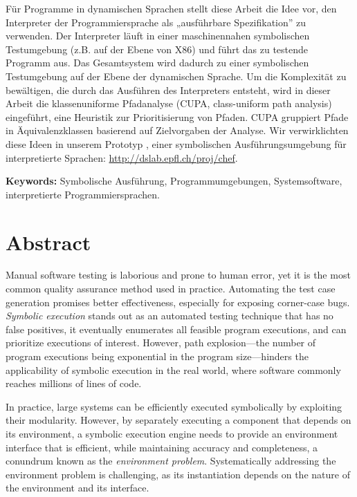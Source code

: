 Für Programme in dynamischen Sprachen stellt diese Arbeit die Idee vor, den Interpreter der Programmiersprache als „ausführbare Spezifikation” zu verwenden. Der Interpreter läuft in einer maschinennahen symbolischen Testumgebung (z.B. auf der Ebene von X86) und führt das zu testende Programm aus. Das Gesamtsystem wird dadurch zu einer symbolischen Testumgebung auf der Ebene der dynamischen Sprache. Um die Komplexität zu bewältigen, die durch das Ausführen des Interpreters entsteht, wird in dieser Arbeit die klassenuniforme Pfadanalyse (CUPA, class-uniform path analysis) eingeführt, eine Heuristik zur Prioritisierung von Pfaden. CUPA gruppiert Pfade in Äquivalenzklassen basierend auf Zielvorgaben der Analyse. Wir verwirklichten diese Ideen in unserem Prototyp \emph{\chef}, einer symbolischen Ausführungsumgebung für interpretierte Sprachen: {\url{http://dslab.epfl.ch/proj/chef}}.

\noindent \textbf{Keywords:} Symbolische Ausführung, Programmumgebungen, Systemsoftware, interpretierte Programmiersprachen.

\chapter*{Abstract}

Manual software testing is laborious and prone to human error, yet it is the most common quality assurance method used in practice.  Automating the test case generation promises better effectiveness, especially for exposing corner-case bugs.
%
\emph{Symbolic execution} stands out as an automated testing technique that has no false positives, it eventually enumerates all feasible program executions, and can prioritize executions of interest.
%
However, path explosion---the number of program executions being exponential in the program size---hinders the applicability of symbolic execution in the real world, where software commonly reaches millions of lines of code.

In practice, large systems can be efficiently executed symbolically by exploiting their modularity.
%
However, by separately executing a component that depends on its environment, a symbolic execution engine needs to provide an environment interface that is efficient, while maintaining accuracy and completeness, a conundrum known as the \emph{environment problem}.
%
Systematically addressing the environment problem is challenging, as its instantiation depends on the nature of the environment and its interface.

